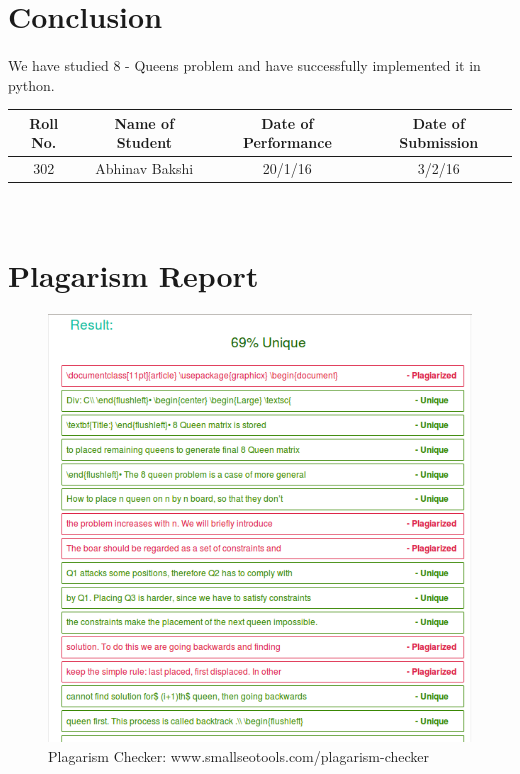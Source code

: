 \documentclass[a4paper,12pt]{article}
\begin{document}
\section{Conclusion}
	\paragraph{} We have studied 8 - Queens problem  and have successfully implemented it in python.
	
\vspace{20px}
\begin{center}
	\begin{tabular}
		{|c|c|c|c|}\hline
		{\bf Roll No.}		&{\bf Name of Student}		&{\bf Date of Performance}  				&{\bf Date of Submission}  \\ \hline
		{302}	&	{Abhinav Bakshi}& {20/1/16}		&  {3/2/16}\\ \hline
	\end{tabular}\\ 
\end{center}

\section{Plagarism Report}
		\begin{figure}[h!]
			\centering
			\includegraphics{8Queen_Plag.png}
			\caption{Plagarism Checker: www.smallseotools.com/plagarism-checker}
		\end{figure}
\end{document}
